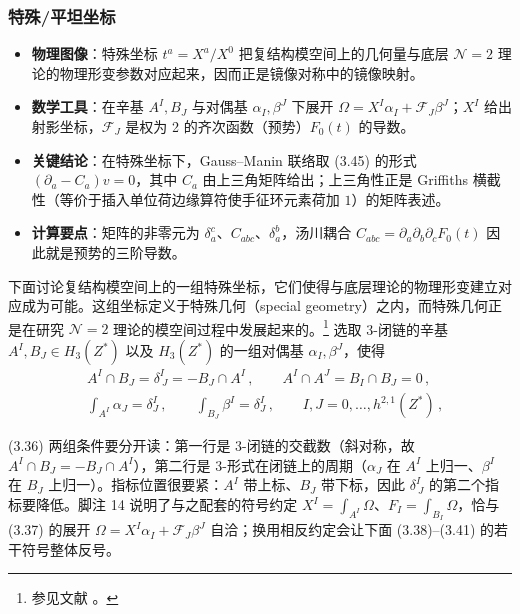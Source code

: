 
\subsubsection{特殊/平坦坐标}
\label{sec:3.5.3}

\begin{keytakeaways}
  \begin{itemize}[leftmargin=1.4em,itemsep=2pt,topsep=2pt]
    \item \textbf{物理图像}：特殊坐标 $t^a=X^a/X^0$ 把复结构模空间上的几何量与底层 $\mathcal{N}=2$ 理论的物理形变参数对应起来，因而正是镜像对称中的镜像映射。
    \item \textbf{数学工具}：在辛基 $A^I,B_J$ 与对偶基 $\alpha_I,\beta^J$ 下展开 $\Omega=X^I\alpha_I+\mathcal{F}_J\beta^J$；$X^I$ 给出射影坐标，$\mathcal{F}_J$ 是权为 2 的齐次函数（预势）$F_0(t)$ 的导数。
    \item \textbf{关键结论}：在特殊坐标下，Gauss--Manin 联络取 (3.45) 的形式 $(\partial_a-C_a)v=0$，其中 $C_a$ 由上三角矩阵给出；上三角性正是 Griffiths 横截性（等价于插入单位荷边缘算符使手征环元素荷加 $1$）的矩阵表述。
    \item \textbf{计算要点}：矩阵的非零元为 $\delta^c_a$、$C_{abc}$、$\delta^b_a$，汤川耦合 $C_{abc}=\partial_a\partial_b\partial_cF_0(t)$ 因此就是预势的三阶导数。
  \end{itemize}
\end{keytakeaways}

下面讨论复结构模空间上的一组特殊坐标，它们使得与底层理论的物理形变建立对应成为可能。这组坐标定义于特殊几何（special geometry）之内，而特殊几何正是在研究 $\mathcal{N}=2$ 理论的模空间过程中发展起来的。\footnote{参见文献 \cite{ref52,ref53,ref54,ref5,ref55,ref12,ref56,ref50,ref57,ref58,ref51,ref59}。}
选取 3-闭链的辛基 $A^I,B_J\in H_3(Z^*)$ 以及 $H_3(Z^*)$ 的一组对偶基 $\alpha_I,\beta^J$，使得
\begin{equation}\tag{3.36}
\begin{aligned}
&A^I\cap B_J=\delta^I_{\ J}=-B_J\cap A^I\,,\qquad A^I\cap A^J=B_I\cap B_J=0\,,\\
&\int_{A^I}\alpha_J=\delta^I_J\,,\qquad \int_{B_J}\beta^I=\delta^I_J\,,\qquad I,J=0,\ldots,h^{2,1}(Z^*)\,,
\end{aligned}
\end{equation}
\begin{yizhu}[易错点]
(3.36) 两组条件要分开读：第一行是 3-闭链的交截数（斜对称，故 $A^I\cap B_J=-B_J\cap A^I$），第二行是 3-形式在闭链上的周期（$\alpha_J$ 在 $A^I$ 上归一、$\beta^I$ 在 $B_J$ 上归一）。指标位置很要紧：$A^I$ 带上标、$B_J$ 带下标，因此 $\delta^I_{\ J}$ 的第二个指标要降低。脚注 14 说明了与之配套的符号约定 $X^I=\int_{A^I}\Omega$、$F_I=\int_{B_I}\Omega$，恰与 (3.37) 的展开 $\Omega=X^I\alpha_I+\mathcal{F}_J\beta^J$ 自洽；换用相反约定会让下面 (3.38)--(3.41) 的若干符号整体反号。
\end{yizhu}

